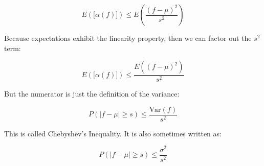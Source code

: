 \documentclass{article}
\begin{document}
\[
E(\lbrack\alpha(f)\rbrack)\le E\left(\dfrac{(f-\mu)^2}{s^2}\right)
\]

Because expectations exhibit the linearity property, then we can
factor out the $s^2$ term:

\[
E(\lbrack\alpha(f)\rbrack)\le \dfrac{E((f-\mu)^2)}{s^2}
\]

But the numerator is just the definition of the variance:

\[
P(|f-\mu|\ge s)\le \dfrac{\text{Var}(f)}{s^2}
\]

This is called Chebyshev's Inequality. It is also sometimes written as:

\[
P(|f-\mu|\ge s)\le \dfrac{\sigma^2}{s^2}
\]
\end{document}
